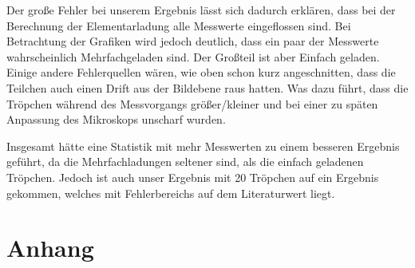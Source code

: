 \documentclass{scrartcl}
\begin{document}
                Der große Fehler bei unserem Ergebnis lässt sich dadurch erklären, dass bei der Berechnung
                der Elementarladung alle Messwerte eingeflossen sind. Bei Betrachtung der Grafiken wird jedoch deutlich,
                dass ein paar der Messwerte wahrscheinlich Mehrfachgeladen sind. Der Großteil ist aber Einfach geladen.
                Einige andere Fehlerquellen wären, wie oben schon kurz angeschnitten, dass die Teilchen auch einen Drift 
                aus der Bildebene raus hatten. Was dazu führt, dass die Tröpchen während des Messvorgangs größer/kleiner und
                bei einer zu späten Anpassung des Mikroskops unscharf wurden.
            
                Insgesamt hätte eine Statistik mit mehr Messwerten zu einem besseren Ergebnis geführt, da die Mehrfachladungen
                seltener sind, als die einfach geladenen Tröpchen. Jedoch ist auch unser Ergebnis mit 20 Tröpchen auf
                ein Ergebnis gekommen, welches mit Fehlerbereichs auf dem Literaturwert liegt.
            
                \section{Anhang}
\end{document}
